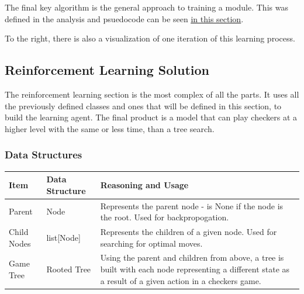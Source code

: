 \documentclass{article}
\makeatletter
\newcommand\subsubsubsection{\@startsection{paragraph}{4}{\z@}{-2.5ex\@plus -1ex \@minus -.25ex}{1.25ex \@plus .25ex}{\normalfont\normalsize\bfseries}}
\newcommand{\myhy}[2]{\hyperref[#1]{\color{black}\setulcolor{black}\ul{#2}}}
\makeatother
\begin{document}
    The final key algorithm is the general approach to training a module. This was defined in the analysis and psuedocode can be
    seen \myhy{Analysis-IofA-NNLib}{in this section}. 
    
    \vspace{1mm}
    To the right, there is also a visualization of one iteration of
    this learning process.
    

    \pagebreak
    \vspace*{7mm}
    \subsection{Reinforcement Learning Solution} \label{RLSDesignStage}
    The reinforcement learning section is the most complex of all the parts. It uses all the previously defined classes and ones that will be defined in this section,
    to build the learning agent. The final product is a model that can play checkers at a higher level with the same or less time, than a tree search.
    \subsubsection{Data Structures}
    \subsubsubsection{MCTS}
    \begin{center}
        \begin{tabular}{|m{10em} | m{12em} | m{15em}|}
            \hline 
                Item & Data Structure & Reasoning and Usage \\
            \hline
            \hline
                Parent & Node & Represents the parent node - is None if the node is the root. Used for backpropogation. \\
            \hline
                Child Nodes & list[Node] & Represents the children of a given node. Used for searching for optimal moves. \\
            \hline
                Game Tree & Rooted Tree & Using the parent and children from above, a tree is built with each node representing a different state as a result of a given action in a checkers game.\\
            \hline
        \end{tabular}
    \end{center}
    
\end{document}
